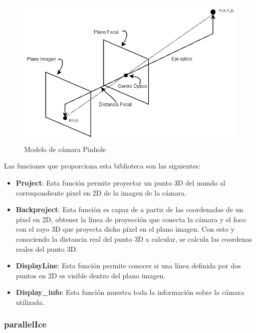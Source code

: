 \begin{figure}[th]
\centering
\includegraphics[scale=0.5]{Figures/pinhole-model.jpg}
\decoRule
\caption[pinhole]{Modelo de cámara Pinhole}
\label{fig:Pinhole}
\end{figure}

Las funciones que proporciona esta biblioteca son las siguientes:

\begin{itemize}
\item \textbf{Project}: Esta función permite proyectar un punto 3D del mundo al correspondiente pixel en 2D de la imagen de la cámara. 

\item \textbf{Backproject}: Esta función es capaz de a partir de las coordenadas de un píxel en 2D, obtener la línea de proyección que conecta la cámara y el foco con el rayo 3D que proyecta dicho píxel en el plano imagen. Con esto y conociendo la distancia real del punto 3D a calcular, se calcula las coordenas reales del punto 3D.

\item \textbf{DisplayLine}: Esta función permite conocer si una línea definida por dos puntos en 2D es visible dentro del plano imagen. 

\item \textbf{Display\_info}: Esta función muestra toda la información sobre la cámara utilizada.

\end{itemize}

\subsubsection{parallelIce}

